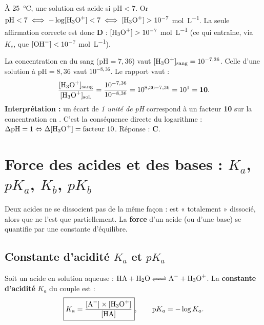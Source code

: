 \documentclass[11pt,a4paper]{article}
\begin{document}
\begin{exemple}
À \SI{25}{\celsius}, une solution est acide si $\mathrm{pH} < 7$. Or
$\mathrm{pH} < 7 \;\Longleftrightarrow\; -\log[\ce{H3O+}] < 7 \;\Longleftrightarrow\; [\ce{H3O+}] > 10^{-7}$ \si{mol.L^{-1}}.
La seule affirmation correcte est donc \textbf{D} : $[\ce{H3O+}] > 10^{-7}$ \si{mol.L^{-1}} (ce qui entraîne,
via $K_e$, que $[\ce{OH-}] < 10^{-7}$ \si{mol.L^{-1}}).
\end{exemple}

\begin{exemple}
La concentration en  du sang ($\mathrm{pH}=7{,}36$) vaut $[\ce{H3O+}]_{\text{sang}} = 10^{-7{,}36}$.
Celle d'une solution à $\mathrm{pH}=8{,}36$ vaut $10^{-8{,}36}$. Le rapport vaut :
\[ \frac{[\ce{H3O+}]_{\text{sang}}}{[\ce{H3O+}]_{\text{sol.}}} = \frac{10^{-7{,}36}}{10^{-8{,}36}} = 10^{8{,}36 - 7{,}36} = 10^{1} = \mathbf{10}. \]
\textbf{Interprétation :} un écart de \emph{1 unité de pH} correspond à un facteur \textbf{10} sur la
concentration en . C'est la conséquence directe du logarithme : $\Delta\mathrm{pH} = 1 \Leftrightarrow
\Delta[\ce{H3O+}] = \text{facteur } 10$. Réponse : \textbf{C}.
\end{exemple}

\section{Force des acides et des bases : $K_a$, $pK_a$, $K_b$, $pK_b$}
Deux acides ne se dissocient pas de la même façon :  est « totalement » dissocié, alors que
 ne l'est que partiellement. La \textbf{force} d'un acide (ou d'une base) se quantifie par une
constante d'équilibre.

\subsection{Constante d'acidité $K_a$ et $pK_a$}

\begin{formule}
Soit un acide  en solution aqueuse : $\ce{HA + H2O <=> A- + H3O+}$. La \textbf{constante d'acidité}
$K_a$ du couple  est :
\[ \boxed{K_a = \frac{[\ce{A-}]\times[\ce{H3O+}]}{[\ce{HA}]}}, \qquad \mathrm{p}K_a = -\log K_a. \]
\end{formule}
\end{document}
